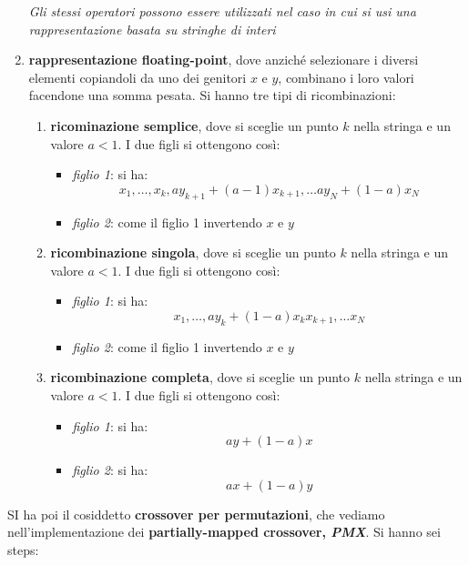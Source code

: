 \documentclass[a4paper,12pt, oneside]{book}
\begin{document}
\begin{enumerate}
\begin{enumerate}
  \end{enumerate}
  \textit{Gli stessi operatori possono essere utilizzati nel caso in
    cui si usi una rappresentazione basata su stringhe di interi} 
  \item \textbf{rappresentazione floating-point}, dove anziché
  selezionare i diversi elementi copiandoli da uno dei genitori $x$ e
  $y$, combinano i loro valori facendone una somma pesata. Si hanno
  tre tipi di ricombinazioni:
  \begin{enumerate}
    \item \textbf{ricominazione semplice}, dove si sceglie un punto
    $k$ nella stringa e un valore $a<1$. I due figli si ottengono
    così:
    \begin{itemize}
      \item \textit{figlio 1}: si ha:
      \[x_1,\ldots,x_k,ay_{k+1}+(a-1)x_{k+1},\ldots ay_N+(1-a)x_N\]
      \item \textit{figlio 2}: come il figlio 1 invertendo $x$ e $y$
    \end{itemize}
    \item \textbf{ricombinazione singola}, dove si sceglie un punto
    $k$ nella stringa e un valore $a<1$. I due figli si ottengono
    così:
    \begin{itemize}
      \item \textit{figlio 1}: si ha:
      \[x_1,\ldots,ay_{k}+(1-a)x_kx_{k+1},\ldots x_N\]
      \item \textit{figlio 2}: come il figlio 1 invertendo $x$ e $y$
    \end{itemize}
    \newpage
    \item \textbf{ricombinazione completa}, dove si sceglie un punto
    $k$ nella stringa e un valore $a<1$. I due figli si ottengono
    così:
    \begin{itemize}
      \item \textit{figlio 1}: si ha:
      \[ay+(1-a)x\]
      \item \textit{figlio 2}: si ha:
      \[ax+(1-a)y\]
    \end{itemize}
  \end{enumerate}
\end{enumerate}
SI ha poi il cosiddetto \textbf{crossover per permutazioni}, che
vediamo nell'implementazione dei \textbf{partially-mapped crossover,
  \textit{PMX}}. Si hanno sei steps:
\end{document}
